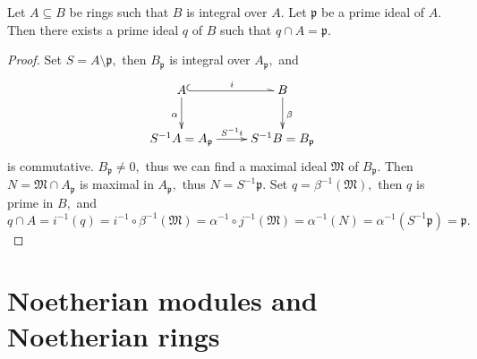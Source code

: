 \begin{thm}
Let $A\subseteq B$ be rings such that $B$ is integral over $A.$ Let
$\mathfrak{p}$ be a prime ideal of $A.$ Then there exists a prime
ideal $q$ of $B$ such that $q\cap A=\mathfrak{p}.$
\end{thm}
\begin{proof}
Set $S=A\setminus \mathfrak{p},$ then $B_{\mathfrak{p}}$ is integral
over $A_{\mathfrak{p}},$ and
\[ \xymatrix{
   A \ar[d]_{\alpha} \ar@^{(->}[r]^-i & B \ar[d]^{\beta} \\
   S^{-1}A=A_{\mathfrak{p}} \ar[r]^-{S^{-1}i} &
   S^{-1}B=B_{\mathfrak{p}} }  \]
is commutative. $B_{\mathfrak{p}}\neq 0,$ thus we can find a maximal
ideal $\mathfrak{M}$ of $B_{\mathfrak{p}}.$ Then $N =
\mathfrak{M}\cap A_{\mathfrak{p}}$ is maximal in $A_{\mathfrak{p}},$
thus $N=S^{-1}\mathfrak{p}.$ Set $q=\beta^{-1}(\mathfrak{M}),$ then
$q$ is prime in $B,$ and
$$q\cap A = i^{-1}(q) = i^{-1}\circ\beta^{-1}(\mathfrak{M}) =
\alpha^{-1}\circ j^{-1}(\mathfrak{M}) = \alpha^{-1}(N) =
\alpha^{-1}(S^{-1}\mathfrak{p}) = \mathfrak{p}.$$
\end{proof}

\newpage

\section{Noetherian modules and Noetherian rings}

